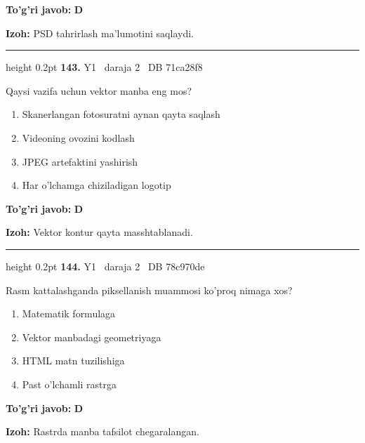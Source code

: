 \documentclass[10pt,a4paper,oneside]{article}
\begin{document}
\begin{tcolorbox}[enhanced,breakable,colback=teal!4,colframe=teal!45!black,boxrule=0.45pt,arc=1.2mm,left=2.8mm,right=2.8mm,top=2mm,bottom=2mm,before skip=2mm,after skip=2mm]
\textbf{\color{teal}To'g'ri javob:} \textbf{D}
\par\smallskip
\textbf{Izoh:} PSD tahrirlash ma'lumotini saqlaydi.
\end{tcolorbox}
\vspace{2mm}\hrule height 0.2pt \vspace{4mm}
\hypertarget{q143}{\textbf{\color{ink}143.}}  {\color{muted}\scriptsize Y1 \textbullet\ daraja 2 \textbullet\ DB 71ca28f8}
\par
Qaysi vazifa uchun vektor manba eng mos?
\begin{enumerate}[label=\Alph*),leftmargin=9mm]
\item Skanerlangan fotosuratni aynan qayta saqlash
\item Videoning ovozini kodlash
\item JPEG artefaktini yashirish
\item Har o'lchamga chiziladigan logotip
\end{enumerate}
\begin{tcolorbox}[enhanced,breakable,colback=teal!4,colframe=teal!45!black,boxrule=0.45pt,arc=1.2mm,left=2.8mm,right=2.8mm,top=2mm,bottom=2mm,before skip=2mm,after skip=2mm]
\textbf{\color{teal}To'g'ri javob:} \textbf{D}
\par\smallskip
\textbf{Izoh:} Vektor kontur qayta masshtablanadi.
\end{tcolorbox}
\vspace{2mm}\hrule height 0.2pt \vspace{4mm}
\hypertarget{q144}{\textbf{\color{ink}144.}}  {\color{muted}\scriptsize Y1 \textbullet\ daraja 2 \textbullet\ DB 78c970de}
\par
Rasm kattalashganda piksellanish muammosi ko'proq nimaga xos?
\begin{enumerate}[label=\Alph*),leftmargin=9mm]
\item Matematik formulaga
\item Vektor manbadagi geometriyaga
\item HTML matn tuzilishiga
\item Past o'lchamli rastrga
\end{enumerate}
\begin{tcolorbox}[enhanced,breakable,colback=teal!4,colframe=teal!45!black,boxrule=0.45pt,arc=1.2mm,left=2.8mm,right=2.8mm,top=2mm,bottom=2mm,before skip=2mm,after skip=2mm]
\textbf{\color{teal}To'g'ri javob:} \textbf{D}
\par\smallskip
\textbf{Izoh:} Rastrda manba tafsilot chegaralangan.
\end{tcolorbox}
\end{document}
